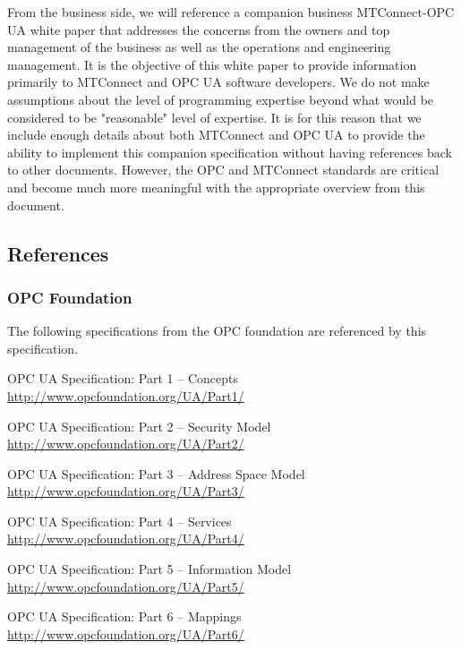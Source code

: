 From the business side, we will reference a companion business MTConnect-OPC UA white paper that addresses the concerns from the owners and top management of the business as well as the operations and engineering management. It is the objective of this white paper to provide information primarily to MTConnect and OPC UA software developers. We do not make assumptions about the level of programming expertise beyond what would be considered to be "reasonable" level of expertise. It is for this reason that we include enough details about both MTConnect and OPC UA to provide the ability to implement this companion specification without having references back to other documents. However, the OPC and MTConnect standards are critical and become much more meaningful with the appropriate overview from this document.

\subsection{References}

\subsubsection{OPC Foundation}

The following specifications from the OPC foundation are referenced by this specification.

\hang [UA Part 1]	OPC UA Specification: Part 1 -- Concepts \\
\url{http://www.opcfoundation.org/UA/Part1/}\label{doc:UA_Part_1}

\hang [UA Part 2]	OPC UA Specification: Part 2 -- Security Model \\
\url{http://www.opcfoundation.org/UA/Part2/}

\hang [UA Part 3]	OPC UA Specification: Part 3 -- Address Space Model \\
\url{http://www.opcfoundation.org/UA/Part3/}

\hang [UA Part 4]	OPC UA Specification: Part 4 -- Services \\
\url{http://www.opcfoundation.org/UA/Part4/}

\hang [UA Part 5]	OPC UA Specification: Part 5 -- Information Model \\
\url{http://www.opcfoundation.org/UA/Part5/}

\hang [UA Part 6]	OPC UA Specification: Part 6 -- Mappings \\
\url{http://www.opcfoundation.org/UA/Part6/}

